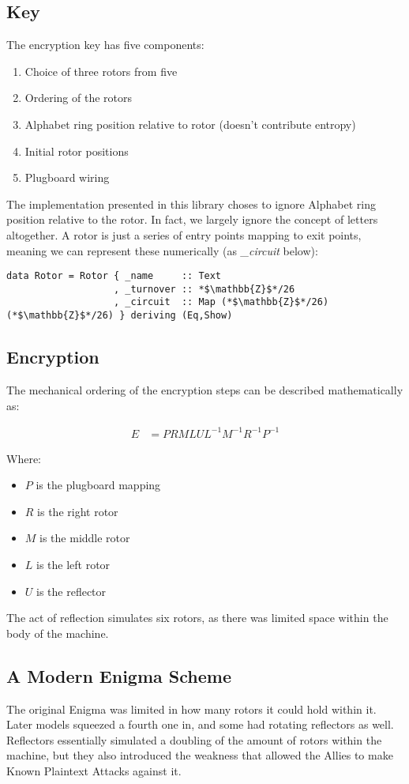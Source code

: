 \documentclass{article}
\begin{document}
\subsection{Key}
The encryption key has five components:
\begin{enumerate}
\item Choice of three rotors from five
\item Ordering of the rotors
\item Alphabet ring position relative to rotor (doesn't contribute entropy)
\item Initial rotor positions
\item Plugboard wiring
\end{enumerate}
The implementation presented in this library choses to ignore Alphabet ring
position relative to the rotor. In fact, we largely ignore the concept of
letters altogether. A rotor is just a series of entry points mapping
to exit points, meaning we can represent these numerically
(as \emph{\_circuit} below):

\begin{lstlisting}
data Rotor = Rotor { _name     :: Text
                   , _turnover :: *$\mathbb{Z}$*/26
                   , _circuit  :: Map (*$\mathbb{Z}$*/26) (*$\mathbb{Z}$*/26) } deriving (Eq,Show)  
\end{lstlisting}

\subsection{Encryption}
The mechanical ordering of the encryption steps can be described
mathematically as:

\begin{align*}
  E &= PRMLUL^{-1}M^{-1}R^{-1}P^{-1}
\end{align*}

Where:
\begin{itemize}
\item $P$ is the plugboard mapping
\item $R$ is the right rotor
\item $M$ is the middle rotor
\item $L$ is the left rotor
\item $U$ is the reflector
\end{itemize}

The act of reflection simulates six rotors, as there was limited space
within the body of the machine. 

\subsection{A Modern Enigma Scheme}
The original Enigma was limited in how many rotors it could hold within
it. Later models squeezed a fourth one in, and some had rotating
reflectors as well. Reflectors essentially simulated a doubling of the
amount of rotors within the machine, but they also introduced the weakness
that allowed the Allies to make Known Plaintext Attacks against it.\\
\end{document}
